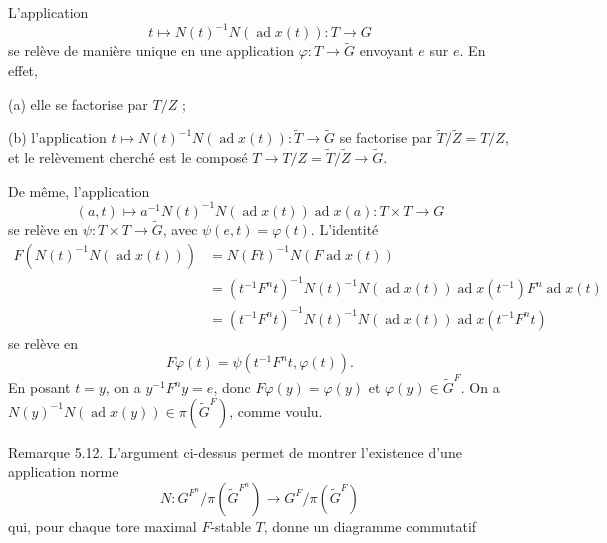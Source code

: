 \documentclass[9pt,twoside]{extarticle}
\begin{document}
{L'application \[
t\longmapsto N(t)^{-1}N(\operatorname{ad}x(t)):T\longrightarrow G
\] se relève de manière unique en une application \(\varphi:T\to\widetilde G\) envoyant \(e\) sur \(e\). En effet,\par

(a) elle se factorise par \(T/Z\) ;\par

(b) l'application \(t\mapsto N(t)^{-1}N(\operatorname{ad}x(t)):\widetilde T\to\widetilde G\) se factorise par \(\widetilde T/\widetilde Z=T/Z\), et le relèvement cherché est le composé \(T\to T/Z=\widetilde T/\widetilde Z\to\widetilde G\).\par

De même, l'application \[
(a,t)\longmapsto a^{-1}N(t)^{-1}N(\operatorname{ad}x(t))\operatorname{ad}x(a):T\times T\longrightarrow G
\] se relève en \(\psi:T\times T\to\widetilde G\), avec \(\psi(e,t)=\varphi(t)\). L'identité \[
\begin{aligned}
F(N(t)^{-1}N(\operatorname{ad}x(t)))
&=N(Ft)^{-1}N(F\operatorname{ad}x(t))\\
&=(t^{-1}F^nt)^{-1}N(t)^{-1}N(\operatorname{ad}x(t))\operatorname{ad}x(t^{-1})F^n\operatorname{ad}x(t)\\
&=(t^{-1}F^nt)^{-1}N(t)^{-1}N(\operatorname{ad}x(t))\operatorname{ad}x(t^{-1}F^nt)
\end{aligned}
\] se relève en \[
F\varphi(t)=\psi(t^{-1}F^nt,\varphi(t)).
\] En posant \(t=y\), on a \(y^{-1}F^ny=e\), donc \(F\varphi(y)=\varphi(y)\) et \(\varphi(y)\in\widetilde G^F\). On a \(N(y)^{-1}N(\operatorname{ad}x(y))\in\pi(\widetilde G^F)\), comme voulu.\par

Remarque 5.12. L'argument ci-dessus permet de montrer l'existence d'une application norme \[
N:G^{F^n}/\pi(\widetilde G^{F^n})\longrightarrow G^F/\pi(\widetilde G^F)
\] qui, pour chaque tore maximal \(F\)-stable \(T\), donne un diagramme commutatif\par
}
\end{document}
